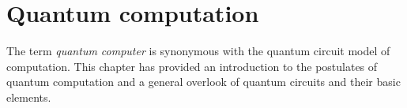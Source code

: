 \chapter{Quantum computation}
The term \emph{quantum computer} is synonymous with the quantum circuit model of computation. This chapter has provided an introduction to the postulates of quantum computation and a general overlook of quantum circuits and their basic elements.


